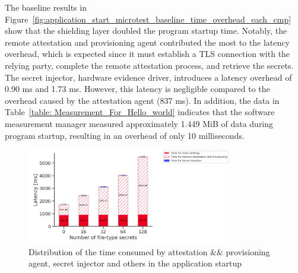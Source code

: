 The baseline results in Figure~\ref{fig:application_start_microtest_baseline_time_overhead_each_cmp} show that the shielding layer doubled the program startup time. Notably, the remote attestation and provisioning agent contributed the most to the latency overhead, which is expected since it must 
establish a TLS connection with the relying party, complete the remote attestation process, and retrieve the secrets. The secret injector, hardware evidence driver, introduces a latency overhead of 0.90 ms and 1.73 ms. However, this latency is negligible compared to the overhead caused by the 
attestation agent (837 ms). In addition, the data in Table~\ref{table: Measurement_For_Hello_world} indicates that the software measurement manager measured approximately 1.449 MiB of data during program startup, resulting in an overhead of only 10 milliseconds. 

\begin{figure}[!htb]
    \centering
    \includegraphics[width=0.8\textwidth]{images/startup_time_change_as_file_type_secret_increasing.PNG}
    \caption[Distribution of the time consumed by attestation \&\& provisioning agent, secret injector and others in the application startup]{Distribution of the time consumed by attestation \&\& provisioning agent, secret injector and others in the application startup}
    \label{fig:startup_time_change_as_file_type_secret_increasing}
\end{figure}

